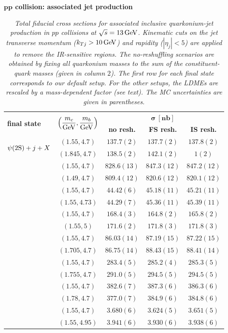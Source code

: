 \begin{table}[t!]
\centering
\renewcommand*{\arraystretch}{1.4}
\textbf{$\boldsymbol{pp}$ collision: associated jet production}
\begin{tabular}[t]{lcccc}
\toprule
\multirow{2}{*}{\textbf{final state}}  & \multirow{2}{*}{$\left(\dfrac{m_c}{\rm GeV}, \dfrac{m_b}{\rm GeV}\right)$}& \multicolumn{3}{c}{$\boldsymbol{\sigma}~[\textbf{nb}]$} \\
& & \textbf{no resh.} & \textbf{FS resh.} & \textbf{IS resh.} \\
\midrule
\multirow{2}{*}{$\psi(2\mathrm{S}) + j + X$} 
& $(1.55,4.7)$  & $137.7(2)$ & ${137.7(2)}$ & ${137.8(2)}$ \\ 
& $(1.845,4.7)$ & $138.5(2)$ & $142.1(2)$ & $1(2)$ \\ 
\hdashline
\multirow{2}{*}{$ \eta_c + j + X$} 
& $(1.55,4.7)$ & $828.6(13)$ & $847.3(12)$ & $847.2(12)$ \\ 
& $(1.49,4.7)$ & $809.4(12)$ & $820.6(12)$ & $820.1(12)$ \\ 
\hdashline
\multirow{2}{*}{$ \Upsilon + j + X$} 
& $(1.55,4.7)$ & $44.42(6)$ & $45.18(11)$ & $45.21(11)$ \\ 
& $(1.55,4.73)$ & $44.29(7)$ & $45.36(11)$ & $45.39(11)$ \\
\hdashline
\multirow{2}{*}{$\eta_b(2\swave) + j + X$} 
& $(1.55,4.7)$ & $168.4(3)$ & $164.8(2)$ & $165.8(2)$ \\
& $(1.55,5)$ & $171.6(2)$ & $171.8(3)$ & $171.8(3)$ \\
\hdashline
\multirow{2}{*}{$\chi_{c0} + j + X$} 
& $(1.55,4.7)$ & $86.03(14)$ & $87.19(15)$ & $87.22(15)$ \\  
& $(1.705,4.7)$ & $86.75(14)$ & $88.43(15)$ & $88.41(14)$ \\  
\hdashline
\multirow{2}{*}{$\chi_{c1} + j + X$} 
& $(1.55,4.7)$ & $283.4(5)$ & $285.2(4)$ & $285.3(5)$ \\ 
& $(1.755,4.7)$ & $291.0(5)$ & $294.5(5)$ & $294.5(5)$ \\ 
\hdashline
\multirow{2}{*}{$\chi_{c2} + j + X$} 
& $(1.55,4.7)$ & $382.6(7)$ & $387.3(6)$ & $386.3(6)$ \\ 
& $(1.78,4.7)$ & $377.0(7)$ & $384.9(6)$ & $384.8(6)$ \\ 
\hdashline
\multirow{2}{*}{$h_b + j + X$}
& $(1.55,4.7)$ & $3.680(6)$ & $3.624(5)$ & $3.651(5)$ \\ 
& $(1.55,4.95)$ & $3.941(6)$ & $3.930(6)$ & $3.938(6)$ \\ 
\bottomrule
\end{tabular}
\caption{\it\small
Total fiducial cross sections for associated inclusive quarkonium-jet production in $p p$ collisions at ${\sqrt{s} = 13\,{\rm GeV}}$. Kinematic cuts on the jet transverse momentum (${k_{Tj} > 10\,{\rm GeV}}$) and rapidity (${|\eta_j|< 5}$) are applied to remove the IR-sensitive regions. The no-reshuffling scenarios are obtained by fixing all quarkonium masses to the sum of the constituent-quark masses (given in column $2$). The first row for each final state corresponds to our default setup. For the other setups, the LDMEs are rescaled by a mass-dependent factor (see text). The MC uncertainties are given in parentheses.}
\label{tab:sigma_pp2Qj}
\end{table}
